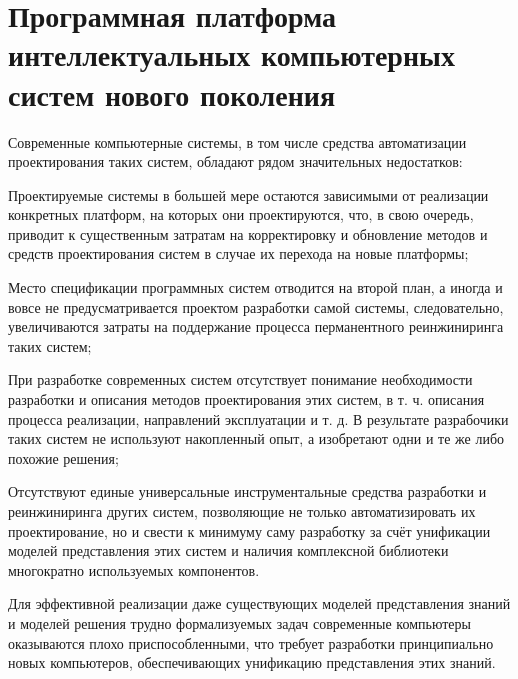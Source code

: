 \usepackage{scn}
\chapter{Программная платформа интеллектуальных компьютерных систем нового поколения}
\label{chapter_soft_platform}



Современные компьютерные системы, в том числе средства автоматизации проектирования таких систем, обладают рядом
значительных недостатков:
\begin{scnitemize}
    \item Проектируемые системы в большей мере остаются зависимыми от реализации конкретных платформ, на которых они
    проектируются, что, в свою очередь, приводит к существенным затратам на корректировку и обновление методов и
    средств проектирования систем в случае их перехода на новые платформы;
    \item Место спецификации программных систем отводится на второй план, а иногда и вовсе не предусматривается
    проектом разработки самой системы, следовательно, увеличиваются затраты на поддержание процесса перманентного
    реинжиниринга таких систем;
    \item При разработке современных систем отсутствует понимание необходимости разработки и описания методов
    проектирования этих систем, в т. ч. описания процесса реализации, направлений эксплуатации и т. д. В результате
    разрабочики таких систем не используют накопленный опыт, а изобретают одни и те же либо похожие решения;
    \item Отсутствуют единые универсальные инструментальные средства разработки и реинжиниринга других систем,
    позволяющие не только автоматизировать их проектирование, но и свести к минимуму саму разработку за счёт
    унификации моделей представления этих систем и наличия комплексной библиотеки многократно используемых компонентов.
    \item Для эффективной реализации даже существующих моделей представления знаний и моделей решения трудно
    формализуемых задач современные компьютеры оказываются плохо приспособленными, что требует разработки принципиально
    новых компьютеров, обеспечивающих унификацию представления этих знаний.
\end{scnitemize}


